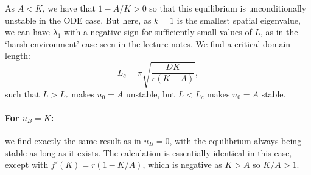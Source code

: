 \documentclass[a4paper,12pt]{article}
\begin{document}
\begin{enumerate}
{\begin{enumerate}[label=(\alph*)]
            As $A<K$, we have that $1-A/K>0$ so that this
            equilibrium is unconditionally unstable in the ODE case.
            But here, as $k=1$ is the smallest spatial eigenvalue,
            we can have $\lambda_1$ with a negative sign for
            sufficiently small values of $L$, as in the
            `harsh environment' case seen in the lecture notes.
            We find a critical domain length:
            \[
                L_c = \pi\sqrt{\frac{DK}{r(K-A)}},
            \]
            such that $L>L_c$ makes $u_0=A$ unstable, but
            $L < L_c$ makes $u_0=A$ stable.

            \paragraph{For $u_B=K$:}
            we find exactly the same result as in $u_B=0$, with the
            equilibrium always being stable as long as it exists.
            The calculation is essentially identical in this case,
            except with $f'(K) = r(1-K/A)$, which is negative as
            $K>A$ so $K/A>1$.



\end{enumerate}}
\end{enumerate}
\end{document}
